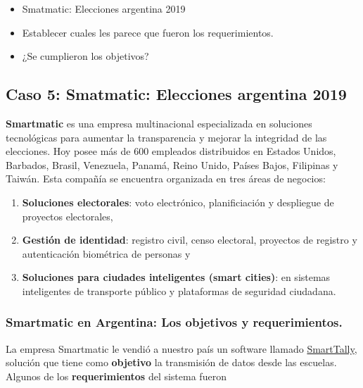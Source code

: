 \documentclass[titlepage,a4paper,twoside]{article}
\begin{document}
    \begin{itemize}
    	\item Smatmatic: Elecciones argentina 2019
    	\item Establecer cuales les parece que fueron los requerimientos.
    	\item ¿Se cumplieron los objetivos?
    \end{itemize}

    \subsection{Caso 5: Smatmatic: Elecciones argentina 2019}
    
    
    \textbf{Smartmatic} es una empresa multinacional especializada en soluciones tecnológicas para aumentar la transparencia y mejorar la integridad de las elecciones. Hoy posee más de $600$ empleados distribuidos en Estados Unidos, Barbados, Brasil, Venezuela, Panamá, Reino Unido, Países Bajos, Filipinas y Taiwán. Esta compañía se encuentra organizada en tres áreas de negocios: 
    \begin{enumerate}
    	\item \textbf{Soluciones electorales}: voto electrónico, planificiación y despliegue de proyectos electorales,
    	\item \textbf{Gestión de identidad}: registro civil, censo electoral, proyectos de registro y autenticación biométrica de personas y
    	\item \textbf{Soluciones para ciudades inteligentes (smart cities)}: en sistemas inteligentes de transporte público y plataformas de seguridad ciudadana.
    \end{enumerate}
    
    
    \subsubsection{Smartmatic en Argentina: Los objetivos y requerimientos.}
    
    La empresa Smartmatic le vendió a nuestro país un software llamado \href{https://www.smartmatic.com/es/elecciones/elecciones-manuales/smarttally/}{SmartTally}, solución que tiene como \textbf{objetivo} la transmisión de datos desde las escuelas. Algunos de los \textbf{requerimientos} del sistema fueron
    
\end{document}
